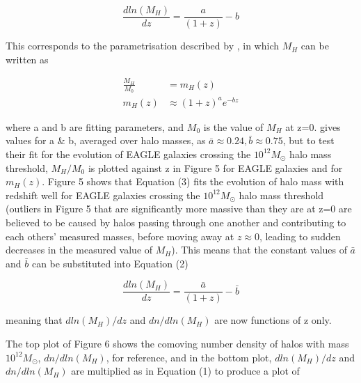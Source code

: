 \documentclass[12pt, twocolumn]{article}%
\begin{document}
\begin{equation}
    \frac{dln(M_H)}{dz}=\frac{a}{(1+z)}-b
\end{equation}

\noindent This corresponds to the parametrisation described by \cite{Correa}, in which $M_H$ can be written as

\begin{align}
    \frac{M_H}{M_0}&=m_H(z) \nonumber \\
    m_H(z)&\approx(1+z)^ae^{-bz}
\end{align}

\noindent where a and b are fitting parameters, and $M_0$ is the value of $M_H$ at z=0. \cite{Correa} gives values for a \& b, averaged over halo masses, as $\bar a \approx 0.24, \bar b \approx 0.75$, but to test their fit for the evolution of EAGLE galaxies crossing the $10^{12}M_\odot$ halo mass threshold, $M_H/M_0$ is plotted against z in Figure 5 for EAGLE galaxies and for $m_H(z)$. Figure 5 shows that Equation (3) fits the evolution of halo mass with redshift well for EAGLE galaxies crossing the $10^{12}M_\odot$ halo mass threshold (outliers in Figure 5 that are significantly more massive than they are at z=0 are believed to be caused by halos passing through one another and contributing to each others' measured masses, before moving away at $z\approx0$, leading to  sudden decreases in the measured value of $M_H$). This means that the constant values of $\bar a$ and $\bar b$ can be substituted into Equation (2)

\begin{equation}
    \frac{dln(M_H)}{dz}=\frac{\bar a}{(1+z)}-\bar b
\end{equation}

\noindent meaning that $dln(M_H)/dz$ and $dn/dln(M_H)$ are now functions of z only.\par

The top plot of Figure 6 shows the comoving number density of halos with mass $10^{12}M_\odot$, $dn/dln(M_H)$, for reference, and in the bottom plot, $dln(M_H)/dz$ and $dn/dln(M_H)$ are multiplied as in Equation (1) to produce a plot of

\onecolumngrid
\end{document}
